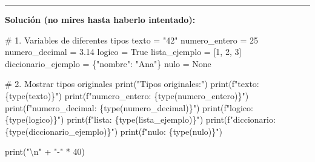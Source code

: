 \documentclass[
  doc,
  floatsintext,
  longtable,
  a4paper,
  nolmodern,
  notxfonts,
  notimes,
  12pt,
  colorlinks=true,linkcolor=blue,citecolor=blue,urlcolor=blue]{apa7}
\newenvironment{Shaded}{\begin{snugshade}}{\end{snugshade}}
\newcommand{\BuiltInTok}[1]{\textcolor[rgb]{0.00,0.23,0.31}{#1}}
\newcommand{\CharTok}[1]{\textcolor[rgb]{0.13,0.47,0.30}{#1}}
\newcommand{\CommentTok}[1]{\textcolor[rgb]{0.37,0.37,0.37}{#1}}
\newcommand{\DecValTok}[1]{\textcolor[rgb]{0.68,0.00,0.00}{#1}}
\newcommand{\FloatTok}[1]{\textcolor[rgb]{0.68,0.00,0.00}{#1}}
\newcommand{\NormalTok}[1]{\textcolor[rgb]{0.00,0.23,0.31}{#1}}
\newcommand{\OperatorTok}[1]{\textcolor[rgb]{0.37,0.37,0.37}{#1}}
\newcommand{\SpecialCharTok}[1]{\textcolor[rgb]{0.37,0.37,0.37}{#1}}
\newcommand{\SpecialStringTok}[1]{\textcolor[rgb]{0.13,0.47,0.30}{#1}}
\newcommand{\StringTok}[1]{\textcolor[rgb]{0.13,0.47,0.30}{#1}}
\newcommand{\VariableTok}[1]{\textcolor[rgb]{0.07,0.07,0.07}{#1}}
\begin{document}
\begin{center}\rule{0.5\linewidth}{0.5pt}\end{center}

\textbf{Solución (no mires hasta haberlo intentado):}

\begin{Shaded}
\begin{Highlighting}[]
\CommentTok{\# 1. Variables de diferentes tipos}
\NormalTok{texto }\OperatorTok{=} \StringTok{"42"}
\NormalTok{numero\_entero }\OperatorTok{=} \DecValTok{25}
\NormalTok{numero\_decimal }\OperatorTok{=} \FloatTok{3.14}
\NormalTok{logico }\OperatorTok{=} \VariableTok{True}
\NormalTok{lista\_ejemplo }\OperatorTok{=}\NormalTok{ [}\DecValTok{1}\NormalTok{, }\DecValTok{2}\NormalTok{, }\DecValTok{3}\NormalTok{]}
\NormalTok{diccionario\_ejemplo }\OperatorTok{=}\NormalTok{ \{}\StringTok{"nombre"}\NormalTok{: }\StringTok{"Ana"}\NormalTok{\}}
\NormalTok{nulo }\OperatorTok{=} \VariableTok{None}

\CommentTok{\# 2. Mostrar tipos originales}
\BuiltInTok{print}\NormalTok{(}\StringTok{"Tipos originales:"}\NormalTok{)}
\BuiltInTok{print}\NormalTok{(}\SpecialStringTok{f"texto: }\SpecialCharTok{\{}\BuiltInTok{type}\NormalTok{(texto)}\SpecialCharTok{\}}\SpecialStringTok{"}\NormalTok{)}
\BuiltInTok{print}\NormalTok{(}\SpecialStringTok{f"numero\_entero: }\SpecialCharTok{\{}\BuiltInTok{type}\NormalTok{(numero\_entero)}\SpecialCharTok{\}}\SpecialStringTok{"}\NormalTok{)}
\BuiltInTok{print}\NormalTok{(}\SpecialStringTok{f"numero\_decimal: }\SpecialCharTok{\{}\BuiltInTok{type}\NormalTok{(numero\_decimal)}\SpecialCharTok{\}}\SpecialStringTok{"}\NormalTok{)}
\BuiltInTok{print}\NormalTok{(}\SpecialStringTok{f"logico: }\SpecialCharTok{\{}\BuiltInTok{type}\NormalTok{(logico)}\SpecialCharTok{\}}\SpecialStringTok{"}\NormalTok{)}
\BuiltInTok{print}\NormalTok{(}\SpecialStringTok{f"lista: }\SpecialCharTok{\{}\BuiltInTok{type}\NormalTok{(lista\_ejemplo)}\SpecialCharTok{\}}\SpecialStringTok{"}\NormalTok{)}
\BuiltInTok{print}\NormalTok{(}\SpecialStringTok{f"diccionario: }\SpecialCharTok{\{}\BuiltInTok{type}\NormalTok{(diccionario\_ejemplo)}\SpecialCharTok{\}}\SpecialStringTok{"}\NormalTok{)}
\BuiltInTok{print}\NormalTok{(}\SpecialStringTok{f"nulo: }\SpecialCharTok{\{}\BuiltInTok{type}\NormalTok{(nulo)}\SpecialCharTok{\}}\SpecialStringTok{"}\NormalTok{)}

\BuiltInTok{print}\NormalTok{(}\StringTok{"}\CharTok{\textbackslash{}n}\StringTok{"} \OperatorTok{+} \StringTok{"{-}"} \OperatorTok{*} \DecValTok{40}\NormalTok{)}


\end{Highlighting}
\end{Shaded}
\end{document}
